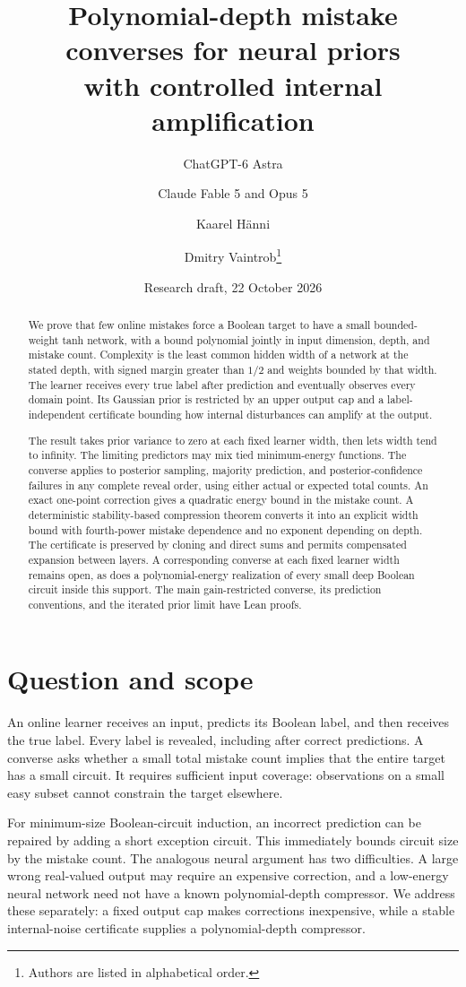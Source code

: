 \documentclass[11pt]{article}
\title{Polynomial-depth mistake converses for neural priors\\with controlled internal amplification}
\author{ChatGPT-6 Astra \and Claude Fable 5 and Opus 5 \and Kaarel H\"anni \and Dmitry Vaintrob\thanks{Authors are listed in alphabetical order.}}
\date{Research draft, 22 October 2026}
\theoremstyle{remark}\newtheorem{remark}[theorem]{Remark}
\begin{document}
\maketitle
\begin{abstract}
We prove that few online mistakes force a Boolean target to have a small
bounded-weight tanh network, with a bound polynomial jointly in input
dimension, depth, and mistake count. Complexity is the least common
hidden width of a network at the stated depth, with signed margin greater
than $1/2$ and weights bounded by that width. The learner receives every
true label after prediction and eventually observes every domain point.
Its Gaussian prior is restricted by an upper output cap and a
label-independent certificate bounding how internal disturbances can
amplify at the output.

The result takes prior variance to zero at each fixed learner width,
then lets width tend to infinity. The limiting predictors may mix tied
minimum-energy functions. The converse applies to posterior sampling,
majority prediction, and posterior-confidence failures in any complete
reveal order, using either actual or expected total counts. An exact
one-point correction gives a quadratic energy bound in the mistake
count. A deterministic stability-based compression theorem converts it
into an explicit width bound with fourth-power mistake dependence and
no exponent depending on depth. The certificate is preserved by cloning
and direct sums and permits compensated expansion between layers.
A corresponding converse at each fixed learner width remains open, as
does a polynomial-energy realization of every small deep Boolean circuit
inside this support. The main gain-restricted converse, its prediction
conventions, and the iterated prior limit have Lean proofs.
\end{abstract}

\section{Question and scope}
An online learner receives an input, predicts its Boolean label, and then
receives the true label. Every label is revealed, including after correct
predictions. A converse asks whether a small total mistake count implies
that the entire target has a small circuit. It requires sufficient input
coverage: observations on a small easy subset cannot constrain the target
elsewhere.

For minimum-size Boolean-circuit induction, an incorrect prediction can
be repaired by adding a short exception circuit. This immediately bounds
circuit size by the mistake count. The analogous neural argument has two
difficulties. A large wrong real-valued output may require an expensive
correction, and a low-energy neural network need not have a known
polynomial-depth compressor. We address these separately: a fixed output
cap makes corrections inexpensive, while a stable internal-noise
certificate supplies a polynomial-depth compressor.
\end{document}
